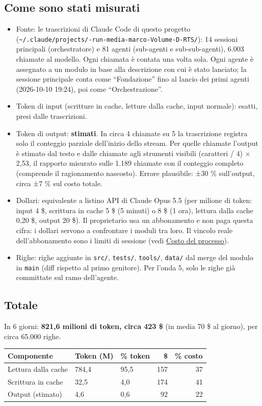 \documentclass[11pt]{article}
\begin{document}
\subsection{Come sono stati misurati}
\label{sec:org81363e2}
\begin{itemize}
\item Fonte: le trascrizioni di Claude Code di questo progetto (\texttt{\textasciitilde{}/.claude/projects/-run-media-marco-Volume-D-RTS/}):
14 sessioni principali (orchestratore) e 81 agenti (sub-agenti e sub-sub-agenti), 6.003 chiamate al modello.
Ogni chiamata è contata una volta sola. Ogni agente è assegnato a un modulo in base alla descrizione con cui è
stato lanciato; la sessione principale conta come ``Fondazione'' fino al lancio dei primi agenti (2026-10-10 19:24),
poi come ``Orchestrazione''.
\item Token di input (scritture in cache, letture dalla cache, input normale): esatti, presi dalle trascrizioni.
\item Token di output: \textbf{stimati}. In circa 4 chiamate su 5 la trascrizione registra solo il conteggio parziale
dell'inizio dello stream. Per quelle chiamate l'output è stimato dal testo e dalle chiamate agli strumenti visibili
(caratteri / 4) × 2,53, il rapporto misurato sulle 1.189 chiamate con il conteggio completo (comprende il
ragionamento nascosto). Errore plausibile: ±30 \% sull'output, circa ±7 \% sul costo totale.
\item Dollari: equivalente a listino API di Claude Opus 5.5 (per milione di token: input 4 \$, scrittura in cache 5 \$
(5 minuti) o 8 \$ (1 ora), lettura dalla cache 0,20 \$, output 20 \$). Il proprietario usa un abbonamento e non paga
questa cifra: i dollari servono a confrontare i moduli tra loro. Il vincolo reale dell'abbonamento sono i limiti
di sessione (vedi \hyperref[sec:org196e259]{Costo del processo}).
\item Righe: righe aggiunte in \texttt{src/}, \texttt{tests/}, \texttt{tools/}, \texttt{data/} dal merge del modulo in \texttt{main} (diff rispetto al
primo genitore). Per l'onda 5, solo le righe già committate sul ramo dell'agente.
\end{itemize}
\subsection{Totale}
\label{sec:org5347403}
In 6 giorni: \textbf{821,6 milioni di token, circa 423 \$} (in media 70 \$ al giorno), per circa 65.000 righe.

\begin{center}
\begin{tabular}{lllrr}
Componente & Token (M) & \% token & \$ & \% costo\\
\hline
Lettura dalla cache & 784,4 & 95,5 & 157 & 37\\
Scrittura in cache & 32,5 & 4,0 & 174 & 41\\
Output (stimato) & 4,6 & 0,6 & 92 & 22\\
\end{tabular}
\end{center}
\end{document}

